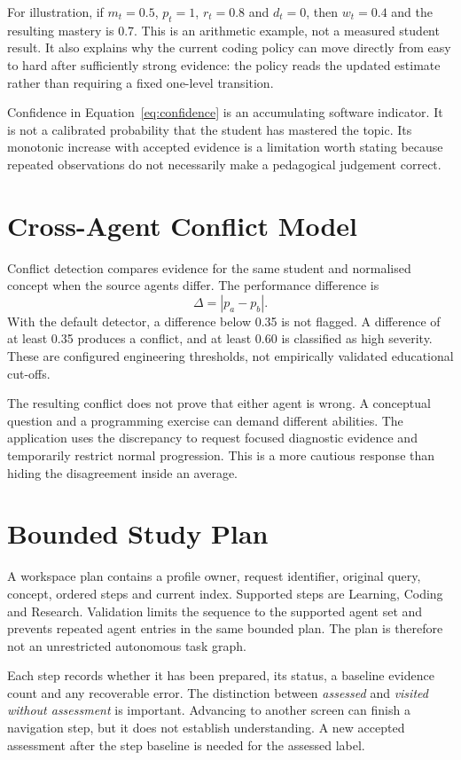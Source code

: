 For illustration, if $m_t=0.5$, $p_t=1$, $r_t=0.8$ and $d_t=0$, then $w_t=0.4$ and the resulting mastery is 0.7. This is an arithmetic example, not a measured student result. It also explains why the current coding policy can move directly from easy to hard after sufficiently strong evidence: the policy reads the updated estimate rather than requiring a fixed one-level transition.

Confidence in Equation~\ref{eq:confidence} is an accumulating software indicator. It is not a calibrated probability that the student has mastered the topic. Its monotonic increase with accepted evidence is a limitation worth stating because repeated observations do not necessarily make a pedagogical judgement correct.

\section{Cross-Agent Conflict Model}
Conflict detection compares evidence for the same student and normalised concept when the source agents differ. The performance difference is
\begin{equation}
\Delta=|p_a-p_b|.
\end{equation}
With the default detector, a difference below 0.35 is not flagged. A difference of at least 0.35 produces a conflict, and at least 0.60 is classified as high severity. These are configured engineering thresholds, not empirically validated educational cut-offs.

The resulting conflict does not prove that either agent is wrong. A conceptual question and a programming exercise can demand different abilities. The application uses the discrepancy to request focused diagnostic evidence and temporarily restrict normal progression. This is a more cautious response than hiding the disagreement inside an average.

\section{Bounded Study Plan}
A workspace plan contains a profile owner, request identifier, original query, concept, ordered steps and current index. Supported steps are Learning, Coding and Research. Validation limits the sequence to the supported agent set and prevents repeated agent entries in the same bounded plan. The plan is therefore not an unrestricted autonomous task graph.

Each step records whether it has been prepared, its status, a baseline evidence count and any recoverable error. The distinction between \textit{assessed} and \textit{visited without assessment} is important. Advancing to another screen can finish a navigation step, but it does not establish understanding. A new accepted assessment after the step baseline is needed for the assessed label.

